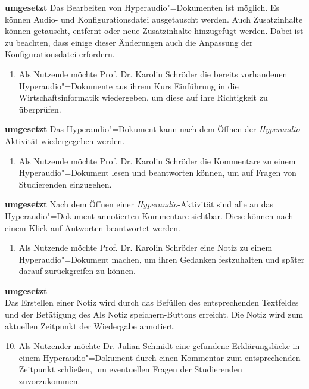 \vspace{-0.1cm}
\textbf{umgesetzt}
Das Bearbeiten von Hyperaudio"=Dokumenten ist möglich. Es können Audio- und Konfigurationsdatei ausgetauscht werden. Auch Zusatzinhalte können getauscht, entfernt oder neue Zusatzinhalte hinzugefügt werden. Dabei ist zu beachten, dass einige dieser Änderungen auch die Anpassung der Konfigurationsdatei erfordern.
\vspace{0.25cm}
\begin{enumerate}[resume*]
\item \label{US-Wiedergabe-Eval} Als Nutzende möchte Prof. Dr. Karolin Schröder die bereits vorhandenen Hyperaudio"=Dokumente aus ihrem Kurs \glqq Einführung in die Wirtschaftsinformatik\grqq{} wiedergeben, um diese auf ihre Richtigkeit zu überprüfen.
\end{enumerate}
\vspace{-0.1cm}
\textbf{umgesetzt}
Das Hyperaudio"=Dokument kann nach dem Öffnen der \textit{Hyperaudio}-Aktivität wiedergegeben werden.
\vspace{0.25cm}
\begin{enumerate}[resume*]
\item \label{US-Antwort-L-Eval} Als Nutzende möchte Prof. Dr. Karolin Schröder die Kommentare zu einem Hyperaudio"=Dokument lesen und beantworten können, um auf Fragen von Studierenden einzugehen.
\end{enumerate}
\vspace{-0.1cm}
\textbf{umgesetzt}
Nach dem Öffnen einer \textit{Hyperaudio}-Aktivität sind alle an das Hyperaudio"=Dokument annotierten Kommentare sichtbar. Diese können nach einem Klick auf \glqq Antworten\grqq{} beantwortet werden.
\vspace{0.25cm}
\begin{enumerate}[resume*]
\item \label{US-Notiz-L-Eval} Als Nutzende möchte Prof. Dr. Karolin Schröder eine Notiz zu einem Hyperaudio"=Dokument machen, um ihren Gedanken festzuhalten und später darauf zurückgreifen zu können.
\end{enumerate}
\vspace{-0.1cm}
\textbf{umgesetzt}\\
Das Erstellen einer Notiz wird durch das Befüllen des entsprechenden Textfeldes und der Betätigung des \glqq Als Notiz speichern\grqq{}-Buttons erreicht. Die Notiz wird zum aktuellen Zeitpunkt der Wiedergabe annotiert.
\vspace{0.25cm}
\begin{enumerate}[leftmargin=1.3cm,label=US-\arabic*:,ref=US-\arabic*]
\setcounter{enumi}{9}
\item \label{US-Kommentar-L-Eval} Als Nutzender möchte Dr. Julian Schmidt eine gefundene Erklärungslücke in einem Hyperaudio"=Dokument durch einen Kommentar zum entsprechenden Zeitpunkt schließen, um eventuellen Fragen der Studierenden zuvorzukommen.
\end{enumerate}
